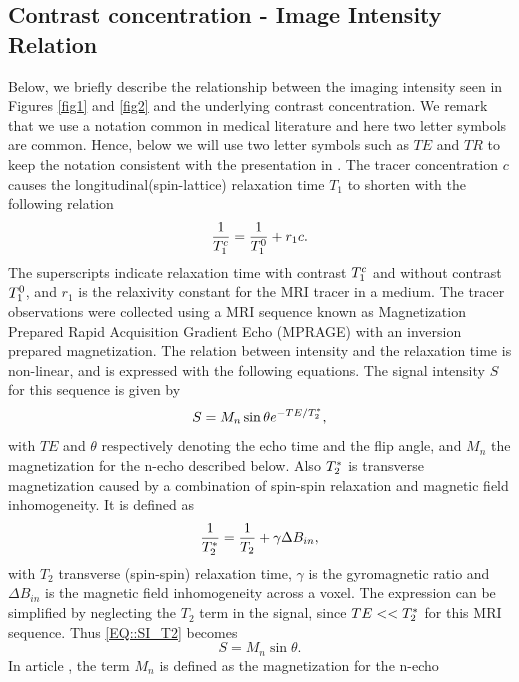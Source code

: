 \documentclass[11pt,a4paper]{article}
\begin{document}
\subsection{Contrast concentration - Image Intensity Relation}
Below, we briefly describe the relationship between the imaging intensity 
seen in Figures \ref{fig1} and \ref{fig2} and the underlying contrast 
concentration. We remark that we use a notation common in medical literature and here two letter symbols are common. Hence, below we will use two letter symbols such as $TE$ and $TR$ to keep the notation consistent with the presentation in \cite{GOWLAND, MPRAGE}.   
The tracer concentration $c$ causes the longitudinal(spin-lattice) relaxation time $T_{1}$ to shorten with the following relation
\begin{equation}
\frac{1}{T_{1}\sp{c}} = \frac{1}{T_{1}\sp{0}} + r_{1}c .
\label{EQ::contrast}
\end{equation}
The superscripts indicate relaxation time with contrast $T_{1}\sp{c}$ and without contrast $T_{1}\sp{0}$, and $r_1$ is the relaxivity constant for the MRI tracer in a medium. 
The tracer observations were collected using a MRI sequence known as  Magnetization Prepared Rapid Acquisition Gradient Echo (MPRAGE) with an inversion prepared magnetization. The relation between intensity and the relaxation time is non-linear, and is expressed with the following equations. The signal intensity $S$ for this sequence is given by
\begin{equation}
S = M_{n} \sin \theta e\sp{ - TE/T_2\sp{*} },
\label{EQ::SI_T2}
\end{equation}
with $TE$ and $\theta$ respectively denoting the echo time and the flip angle, and $M_{n}$ the magnetization for the n-echo described below. 
Also $T_2\sp{*}$ is transverse magnetization caused by a combination of spin-spin relaxation and magnetic field inhomogeneity. It is defined as 
\begin{equation}
\frac{1}{T_2\sp{*}} = \frac{1}{T_2} + \gamma \Delta B_{in} ,
\end{equation}
with $T_2$ transverse (spin-spin) relaxation time, $\gamma$ is the gyromagnetic ratio and $\Delta B_{in}$ is the magnetic field inhomogeneity across a voxel. The expression can be simplified by neglecting the $T_2$ term in the signal, since $TE <<T_2\sp{*}$ for this MRI sequence. Thus \eqref{EQ::SI_T2} becomes 
\begin{equation}
S = M_{n} \sin \theta.
\label{EQ::SI}
\end{equation}
In article \cite{GOWLAND}, the term $M_n$ is defined as the magnetization for the n-echo 
\end{document}
